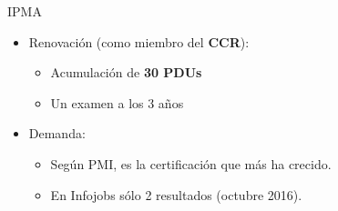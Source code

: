 \begin{frame}[allowframebreaks]{IPMA}
	\begin{itemize}
		\item Renovación (como miembro del \textbf{CCR}):
		\begin{itemize}
			\item Acumulación de \textbf{30 PDUs}
			\item Un examen a los 3 años
		\end{itemize}
		\item Demanda:
		\begin{itemize}
			\item Según PMI, es la certificación que más ha crecido.
			\item En Infojobs sólo 2 resultados (octubre 2016).
		\end{itemize}
	\end{itemize}
\end{frame}
